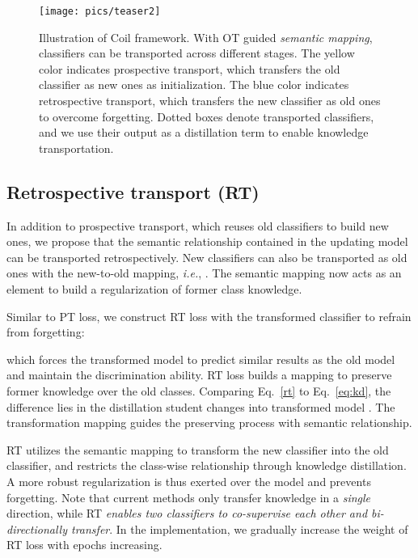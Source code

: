 \documentclass[sigconf]{acmart}
\newcommand{\ie}{\emph{i.e.}}
\newcommand{\name}{{\sc Coil }}
\begin{document}
\begin{figure}[t]
	\begin{center}
		{\texttt{[image: pics/teaser2]}\label{figure:2a}}
	\end{center}
	\vspace{-3mm}
	\caption{\small Illustration of  \name framework. With OT guided \emph{semantic mapping}, classifiers can be transported across different stages. The yellow color indicates prospective transport, which transfers the old classifier as new ones as initialization. The blue color indicates retrospective transport, which transfers the new classifier as old ones to overcome forgetting. Dotted boxes denote transported classifiers, and we use their output as a distillation term to enable knowledge transportation.
	} \label{figure:method}
	\vspace{-3mm}
\end{figure} 

\subsection{Retrospective transport (RT)}
In addition to prospective transport, which reuses old classifiers to build new ones, we propose that the semantic relationship contained in the updating model can be transported  retrospectively. New classifiers can also be transported as old ones with the new-to-old mapping, \ie, .  The semantic mapping now acts as an element to build a regularization of former class knowledge.

 Similar to PT loss, we construct RT loss with the transformed classifier to refrain from forgetting:

which forces the transformed model to predict similar results as  the old model and maintain the discrimination ability. RT loss builds a mapping to preserve former knowledge over the old classes. Comparing Eq.~\ref{rt} to Eq.~\ref{eq:kd}, the difference lies in the distillation student changes into transformed model . The transformation mapping  guides the preserving process with semantic relationship.

 RT utilizes the semantic mapping to transform the new classifier into the old classifier, and restricts the class-wise relationship through knowledge distillation. A more robust regularization is thus exerted over the model and prevents forgetting. Note that current methods only transfer knowledge in a \emph{single} direction, while RT \emph{enables two classifiers to co-supervise each other and bi-directionally transfer}.
In the implementation, we gradually increase the weight of RT loss with epochs increasing. 
\end{document}
